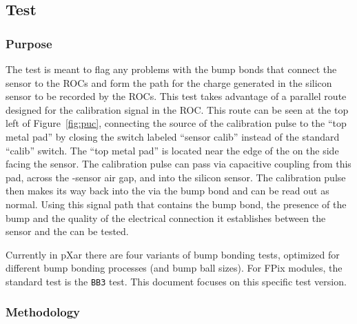 
\newpage

\subsection{\bb Test}
\label{ss:bb}

\subsubsection{Purpose}

The \bb test is meant to flag any problems with the bump bonds that connect the sensor to the ROCs
and form the path for the charge generated in the silicon sensor to be recorded by the ROCs.
This test takes advantage of a parallel route designed for the calibration signal in the ROC.
This route can be seen at the top left of Figure~\ref{fig:puc}, 
connecting the source of the \vcal calibration pulse to the ``top metal pad'' 
by closing the switch labeled ``sensor calib'' instead of the standard ``calib'' switch.
The ``top metal pad'' is located near the edge of the \roc on the side facing the sensor.
The calibration pulse can pass via capacitive coupling from this pad, 
across the \roc-sensor air gap, and into the silicon sensor.
The calibration pulse then makes its way back into the \roc via the bump bond and can be read out as normal.
Using this signal path that contains the bump bond, 
the presence of the bump and the quality of the electrical connection it establishes between the sensor and the \roc can be tested.

Currently in pXar there are four variants of bump bonding tests,
optimized for different bump bonding processes (and bump ball sizes).  
For FPix modules, the standard test is the {\tt BB3} test.
This document focuses on this specific \bb test version.

\subsubsection{Methodology}

